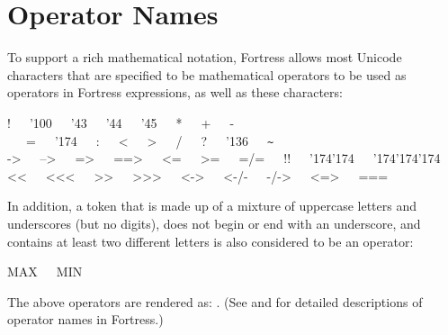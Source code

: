 %
%
%
%

\section{Operator Names}


To support a rich mathematical notation, Fortress allows most Unicode
characters
that are specified to be mathematical operators to be used as operators in
Fortress expressions, as well as these characters:
\begin{ttt}
!~~~{\char'100}~~~{\char'43}~~~{\char'44}~~~{\char'45}~~~*~~~+~~~-~~~=~~~{\char'174}~~~:~~~<~~~>~~~/~~~?~~~{\char'136}~~~{\verb+~+} \\
->~~~-->~~~=>~~~==>~~~<=~~~>=~~~=/=~~~!!~~~{\char'174}{\char'174}~~~{\char'174}{\char'174}{\char'174}\\
<<~~~<<<~~~>>~~~>>>~~~<->~~~<-/-~~~-/->~~~<=>~~~===
\end{ttt}
In addition, a token that is made up of a mixture of uppercase letters and underscores
(but no digits), does not begin or end with an underscore, and contains at least two
different letters is also considered to be an operator:
\begin{ttt}
MAX~~~MIN
\end{ttt}
The above operators are rendered as:
.
(See  and
 for detailed descriptions of operator
names in Fortress.)
